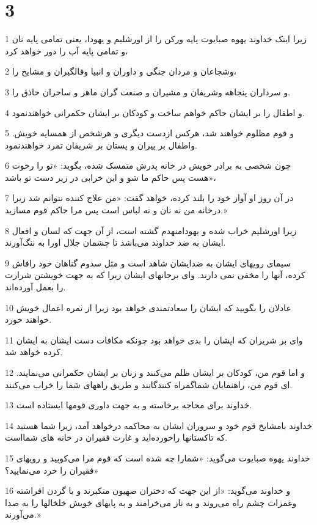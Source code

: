 \chapter{3}

\par 1 زیرا اینک خداوند یهوه صبایوت پایه ورکن را از اورشلیم و یهودا، یعنی تمامی پایه نان و تمامی پایه آب را دور خواهد کرد،
\par 2 وشجاعان و مردان جنگی و داوران و انبیا وفالگیران و مشایخ را،
\par 3 و سرداران پنجاهه وشریفان و مشیران و صنعت گران ماهر و ساحران حاذق را.
\par 4 و اطفال را بر ایشان حاکم خواهم ساخت و کودکان بر ایشان حکمرانی خواهندنمود.
\par 5 و قوم مظلوم خواهند شد، هرکس ازدست دیگری و هرشخص از همسایه خویش. واطفال بر پیران و پستان بر شریفان تمرد خواهندنمود.
\par 6 چون شخصی به برادر خویش در خانه پدرش متمسک شده، بگوید: «تو را رخوت هست پس حاکم ما شو و این خرابی در زیر دست تو باشد»،
\par 7 در آن روز او آواز خود را بلند کرده، خواهد گفت: «من علاج کننده نتوانم شد زیرا درخانه من نه نان و نه لباس است پس مرا حاکم قوم مسازید.»
\par 8 زیرا اورشلیم خراب شده و یهودامنهدم گشته است، از آن جهت که لسان و افعال ایشان به ضد خداوند می‌باشد تا چشمان جلال اورا به ننگ‌آورند.
\par 9 سیمای رویهای ایشان به ضدایشان شاهد است و مثل سدوم گناهان خود رافاش کرده، آنها را مخفی نمی دارند. وای برجانهای ایشان زیرا که به جهت خویشتن شرارت را بعمل آورده‌اند.
\par 10 عادلان را بگویید که ایشان را سعادتمندی خواهد بود زیرا از ثمره اعمال خویش خواهند خورد.
\par 11 وای بر شریران که ایشان را بدی خواهد بود چونکه مکافات دست ایشان به ایشان کرده خواهد شد.
\par 12 و اما قوم من، کودکان بر ایشان ظلم می‌کنند و زنان بر ایشان حکمرانی می‌نمایند. ای قوم من، راهنمایان شماگمراه کنندگانند و طریق راههای شما را خراب می‌کنند.
\par 13 خداوند برای محاجه برخاسته و به جهت داوری قومها ایستاده است.
\par 14 خداوند بامشایخ قوم خود و سروران ایشان به محاکمه درخواهد آمد، زیرا شما هستید که تاکستانها راخورده‌اید و غارت فقیران در خانه های شمااست.
\par 15 خداوند یهوه صبایوت می‌گوید: «شمارا چه شده است که قوم مرا می‌کوبید و رویهای فقیران را خرد می‌نمایید؟»
\par 16 و خداوند می‌گوید: «از این جهت که دختران صهیون متکبرند و با گردن افراشته وغمزات چشم راه می‌روند و به ناز می‌خرامند و به پایهای خویش خلخالها را به صدا می‌آورند.»
